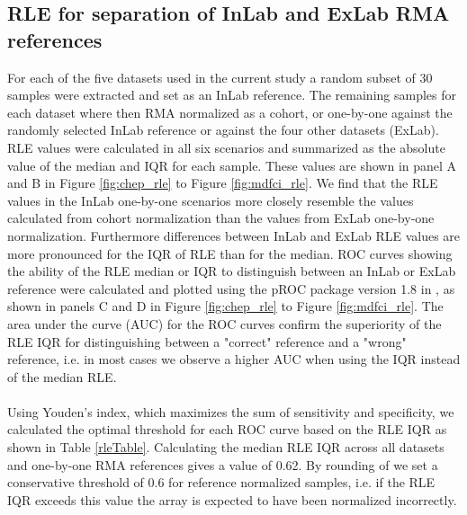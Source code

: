 \subsection{RLE for separation of InLab and ExLab RMA references} \label{rle_sepa}
For each of the five datasets used in the current study a random subset of 30 samples were extracted and set as an InLab reference. The remaining samples for each dataset where then RMA normalized as a cohort, or one-by-one against the randomly selected InLab reference or against the four other datasets (ExLab). RLE values were calculated in all six scenarios and summarized as the absolute value of the median and IQR for each sample. These values are shown in panel A and B in Figure \ref{fig:chep_rle} to Figure \ref{fig:mdfci_rle}. We find that the RLE values in the InLab one-by-one scenarios more closely resemble the values calculated from cohort normalization than the values from ExLab one-by-one normalization. Furthermore differences between InLab and ExLab RLE values are more pronounced for the IQR of RLE than for the median. ROC curves showing the ability of the RLE median or IQR to distinguish between an InLab or ExLab reference were calculated and plotted using the pROC package version 1.8 \citep{Robin2011} in \R, as shown in panels C and D in Figure \ref{fig:chep_rle} to Figure \ref{fig:mdfci_rle}. The area under the curve (AUC) for the ROC curves confirm the superiority of the RLE IQR for distinguishing between a "correct" reference and a "wrong" reference, i.e. in most cases we observe a higher AUC when using the IQR instead of the median RLE.\\\\
Using Youden's index, which maximizes the sum of sensitivity and specificity, we calculated the optimal threshold for each ROC curve based on the RLE IQR as shown in Table \ref{rleTable}. Calculating the median RLE IQR across all datasets and one-by-one RMA references gives a value of 0.62. By rounding of we set a conservative threshold of 0.6 for reference normalized samples, i.e. if the RLE IQR exceeds this value the array is expected to have been normalized incorrectly.

